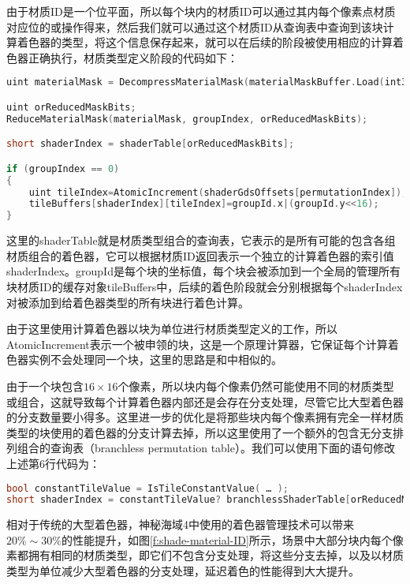 由于材质ID是一个位平面，所以每个块内的材质ID可以通过其内每个像素点材质对应位的或操作得来，然后我们就可以通过这个材质ID从查询表中查询到该块计算着色器的类型，将这个信息保存起来，就可以在后续的阶段被使用相应的计算着色器正确执行，材质类型定义阶段的代码如下：

\begin{lstlisting}[language=C++]
uint materialMask = DecompressMaterialMask(materialMaskBuffer.Load(int3(screenCoord, 0)));

uint orReducedMaskBits;
ReduceMaterialMask(materialMask, groupIndex, orReducedMaskBits);

short shaderIndex = shaderTable[orReducedMaskBits];

if (groupIndex == 0)
{
	uint tileIndex=AtomicIncrement(shaderGdsOffsets[permutationIndex]);
	tileBuffers[shaderIndex][tileIndex]=groupId.x|(groupId.y<<16);
}
\end{lstlisting}

这里的shaderTable就是材质类型组合的查询表，它表示的是所有可能的包含各组材质组合的着色器，它可以根据材质ID返回表示一个独立的计算着色器的索引值shaderIndex。groupId是每个块的坐标值，每个块会被添加到一个全局的管理所有块材质ID的缓存对象tileBuffers中，后续的着色阶段就会分别根据每个shaderIndex对被添加到给着色器类型的所有块进行着色计算。

由于这里使用计算着色器以块为单位进行材质类型定义的工作，所以AtomicIncrement表示一个被申领的块，这是一个原理计算器，它保证每个计算着色器实例不会处理同一个块，这里的思路是和\cite{a:SPU-basedDeferredShadingforBattlefield3onPlaystation3}中相似的。

由于一个块包含$16\times 16$个像素，所以块内每个像素仍然可能使用不同的材质类型或组合，这就导致每个计算着色器内部还是会存在分支处理，尽管它比大型着色器的分支数量要小得多。这里进一步的优化是将那些块内每个像素拥有完全一样材质类型的块使用的着色器的分支计算去掉，所以这里使用了一个额外的包含无分支排列组合的查询表（branchless permutation table）。我们可以使用下面的语句修改上述第6行代码为：

\begin{lstlisting}[language=C++]
bool constantTileValue = IsTileConstantValue( … );
short shaderIndex = constantTileValue? branchlessShaderTable[orReducedMaskBits]: shaderTable[orReducedMaskBits];
\end{lstlisting}

相对于传统的大型着色器，神秘海域4中使用的着色器管理技术可以带来$20\%\sim 30\%$的性能提升，如图\ref{f:shade-material-ID}所示，场景中大部分块内每个像素都拥有相同的材质类型，即它们不包含分支处理，将这些分支去掉，以及以材质类型为单位减少大型着色器的分支处理，延迟着色的性能得到大大提升。

